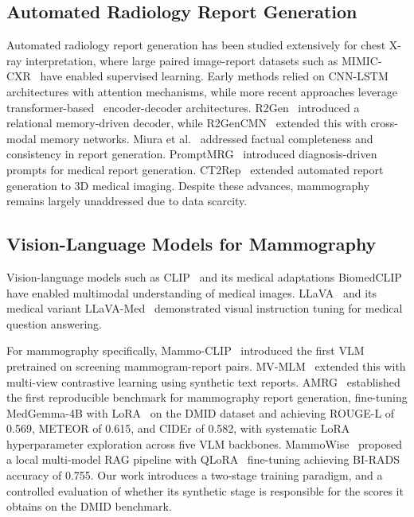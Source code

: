 \documentclass{wlscirep}
\begin{document}
\subsection*{Automated Radiology Report Generation}

Automated radiology report generation has been studied extensively for chest X-ray interpretation, where large paired image-report datasets such as MIMIC-CXR~\cite{johnson2019mimiccxr} have enabled supervised learning. Early methods relied on CNN-LSTM architectures with attention mechanisms, while more recent approaches leverage transformer-based~\cite{vaswani2017attention} encoder-decoder architectures. R2Gen~\cite{chen2020r2gen} introduced a relational memory-driven decoder, while R2GenCMN~\cite{chen2022r2gencmn} extended this with cross-modal memory networks. Miura et al.~\cite{miura2021improving} addressed factual completeness and consistency in report generation. PromptMRG~\cite{jin2024promptmrg} introduced diagnosis-driven prompts for medical report generation. CT2Rep~\cite{hamamci2024ct2rep} extended automated report generation to 3D medical imaging. Despite these advances, mammography remains largely unaddressed due to data scarcity.

\subsection*{Vision-Language Models for Mammography}

Vision-language models such as CLIP~\cite{radford2021clip} and its medical adaptations BiomedCLIP~\cite{zhang2023biomedclip} have enabled multimodal understanding of medical images. LLaVA~\cite{liu2024llava} and its medical variant LLaVA-Med~\cite{li2024llavamed} demonstrated visual instruction tuning for medical question answering.

For mammography specifically, Mammo-CLIP~\cite{ghosh2024} introduced the first VLM pretrained on screening mammogram-report pairs. MV-MLM~\cite{ahmed2025} extended this with multi-view contrastive learning using synthetic text reports. AMRG~\cite{sung2025} established the first reproducible benchmark for mammography report generation, fine-tuning MedGemma-4B with LoRA~\cite{hu2022lora} on the DMID dataset and achieving ROUGE-L of 0.569, METEOR of 0.615, and CIDEr of 0.582, with systematic LoRA hyperparameter exploration across five VLM backbones. MammoWise~\cite{jahangir2026} proposed a local multi-model RAG pipeline with QLoRA~\cite{dettmers2024qlora} fine-tuning achieving BI-RADS accuracy of 0.755. Our work introduces a two-stage training paradigm, and a controlled evaluation of whether its synthetic stage is responsible for the scores it obtains on the DMID benchmark.
\end{document}
